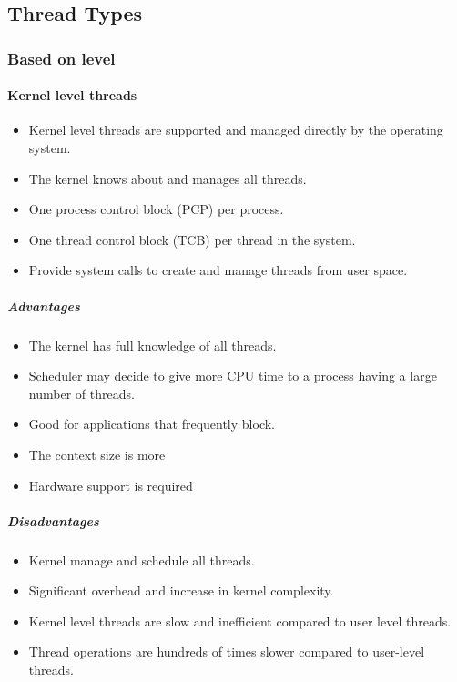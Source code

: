 \subsection{Thread Types}
\subsubsection{Based on level}
\paragraph{Kernel level threads}
\begin{itemize}
	\item Kernel level threads are supported and managed directly by the operating system.
	\item The kernel knows about and manages all threads.
	\item One process control block (PCP) per process.
	\item One thread control block (TCB) per thread in the system.
	\item Provide system calls to create and manage threads from user space.
\end{itemize}

\subparagraph{Advantages}
\begin{itemize}
	\item The kernel has full knowledge of all threads.
	\item Scheduler may decide to give more CPU time to a process having a large number of threads.
	\item Good for applications that frequently block.
	\item The context size is more
	\item Hardware support is required
\end{itemize}

\subparagraph{Disadvantages}
\begin{itemize}
	\item Kernel manage and schedule all threads.
	\item Significant overhead and increase in kernel complexity.
	\item Kernel level threads are slow and inefficient compared to user level threads.
	\item Thread operations are hundreds of times slower compared to user-level threads.
\end{itemize}

